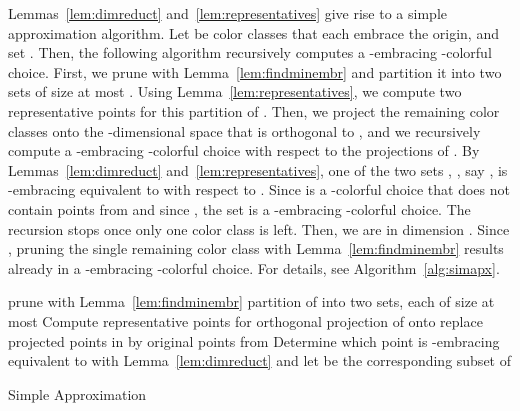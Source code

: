 Lemmas~\ref{lem:dimreduct} and~\ref{lem:representatives} give
rise to a simple approximation algorithm.
Let  be  color classes
that each embrace the origin, and set . Then, the following algorithm 
recursively computes a -embracing -colorful choice.
First, we prune  with Lemma~\ref{lem:findminembr} and 
partition it into two sets
 of size at most . Using Lemma~\ref{lem:representatives}, we compute two
representative points  for this partition of .
Then, we project the remaining  color classes onto the
-dimensional space that is orthogonal to 
, and we recursively compute a 
-embracing -colorful choice  with respect to
the projections of . By Lemmas~\ref{lem:dimreduct}
and~\ref{lem:representatives}, one of the two sets , , 
say , is -embracing
equivalent to  with respect to . Since  is a
-colorful choice that does not contain points from  and since
, the set  is a -embracing -colorful
choice. The recursion stops once only one color class is left. Then, 
we are in dimension . Since , pruning the 
single remaining color class with
Lemma~\ref{lem:findminembr} results already in a -embracing 
-colorful choice.  For details, see Algorithm~\ref{alg:simapx}.

\begin{alg}
   prune  with Lemma~\ref{lem:findminembr}\;
  \lIf{}{\Return{}}
   partition of  into two sets, each of size at most
  \;
  Compute representative points  for \;
   orthogonal projection of
   onto \;
   \Recurse{}\;
   replace projected points in  by original points from
  \;
  Determine which point  is -embracing
  equivalent to  with Lemma~\ref{lem:dimreduct} 
  and let  be the corresponding subset of \;
  \;
  \caption[Computing -embracing -colorful
  choices.]{Simple Approximation}
  \label{alg:simapx}
\end{alg}

